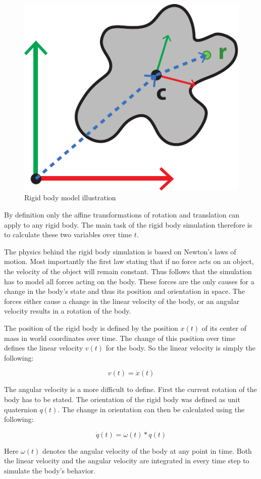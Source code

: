 \begin{figure}[htb]
\centering
\includegraphics[width=.4\textwidth]{images/rigid_body_1.pdf}
\caption{Rigid body model illustration}
\label{img:rigid_body}
\end{figure}

By definition only the affine transformations of rotation and translation can apply to any rigid body. The main task of the rigid body simulation therefore is to calculate these two variables over time \(t\).

The physics behind the rigid body simulation is based on Newton's laws of motion. Most importantly the first law stating that if no force acts on an object, the velocity of the object will remain constant. Thus follows that the simulation has to model all forces acting on the body. These forces are the only causes for a change in the body's state and thus its position and orientation in space. The forces either cause a change in the linear velocity of the body, or an angular velocity results in a rotation of the body. 

The position of the rigid body is defined by the position $x(t)$ of its center of mass in world coordinates over time. The change of this position over time defines the linear velocity $v(t)$ for the body. So the linear velocity is simply the following:

\begin{equation}
v(t) = \dot{x}(t)
\end{equation}

The angular velocity is a more difficult to define. First the current rotation of the body has to be stated. The orientation of the rigid body was defined as unit quaternion $q(t)$. The change in orientation can then be calculated using the following:

\begin{equation}
\dot{q}(t) = \omega(t) * q(t)
\end{equation}

Here $\omega(t)$ denotes the angular velocity of the body at any point in time. Both the linear velocity and the angular velocity are integrated in every time step to simulate the body's behavior.

